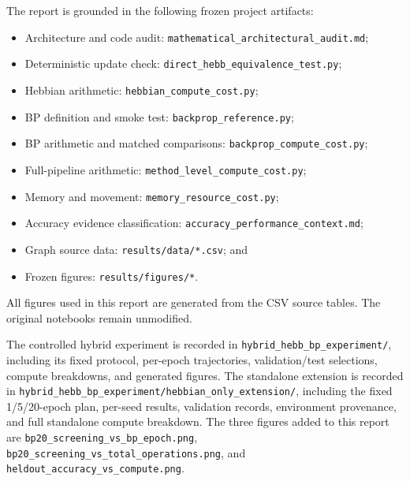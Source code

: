 \documentclass{article}
\begin{document}
    The report is grounded in the following frozen project artifacts:
    \begin{itemize}[noitemsep]
    \item Architecture and code audit: \texttt{mathematical\_\allowbreak architectural\_\allowbreak audit.md};
    \item Deterministic update check: \texttt{direct\_\allowbreak hebb\_\allowbreak equivalence\_\allowbreak test.py};
    \item Hebbian arithmetic: \texttt{hebbian\_\allowbreak compute\_\allowbreak cost.py};
    \item BP definition and smoke test: \texttt{backprop\_\allowbreak reference.py};
    \item BP arithmetic and matched comparisons: \texttt{backprop\_\allowbreak compute\_\allowbreak cost.py};
    \item Full-pipeline arithmetic: \texttt{method\_\allowbreak level\_\allowbreak compute\_\allowbreak cost.py};
    \item Memory and movement: \texttt{memory\_\allowbreak resource\_\allowbreak cost.py};
    \item Accuracy evidence classification: \texttt{accuracy\_\allowbreak performance\_\allowbreak context.md};
    \item Graph source data: \texttt{results/data/*.csv}; and
    \item Frozen figures: \texttt{results/figures/*}.
    \end{itemize}
    All figures used in this report are generated from the CSV source tables. The original notebooks remain unmodified.

    {\color{red}The controlled hybrid experiment is recorded in \texttt{hybrid\_hebb\_bp\_experiment/}, including its fixed protocol, per-epoch trajectories, validation/test selections, compute breakdowns, and generated figures. The standalone extension is recorded in \texttt{hybrid\_hebb\_bp\_experiment/hebbian\_only\_extension/}, including the fixed 1/5/20-epoch plan, per-seed results, validation records, environment provenance, and full standalone compute breakdown. The three figures added to this report are \texttt{bp20\_screening\_vs\_bp\_epoch.png}, \texttt{bp20\_screening\_vs\_total\_operations.png}, and \texttt{heldout\_accuracy\_vs\_compute.png}.}
    
    
    
    
    
\end{document}
